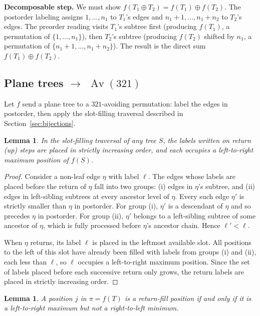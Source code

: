 \documentclass[a4paper,11pt]{article}
\newtheorem{lemma}[theorem]{Lemma}
\theoremstyle{definition}
\DeclareMathOperator{\Av}{Av}
\begin{document}
\textbf{Decomposable step.}
We must show
$f(T_1 \oplus T_2) = f(T_1) \oplus f(T_2)$.
The postorder labeling assigns $1, \ldots, n_1$ to
$T_1$'s edges and $n_1{+}1, \ldots, n_1{+}n_2$ to
$T_2$'s edges. The preorder reading visits $T_1$'s
subtree first (producing $f(T_1)$, a permutation of
$\{1, \ldots, n_1\}$), then $T_2$'s subtree (producing
$f(T_2)$ shifted by $n_1$, a permutation of
$\{n_1{+}1, \ldots, n_1{+}n_2\}$). The result is the
direct sum $f(T_1) \oplus f(T_2)$.

\subsection{Plane trees $\to$ $\Av(321)$}\label{sec:bij-trees-321}

Let $f$ send a plane tree to a $321$-avoiding
permutation: label the edges in postorder, then apply
the slot-filling traversal described in
Section~\ref{sec:bijections}.

\begin{lemma}\label{lem:retlmax}
In the slot-filling traversal of any tree $S$, the
labels written on return (up) steps are placed in
strictly increasing order, and each occupies a
left-to-right maximum position of $f(S)$.
\end{lemma}

\begin{proof}
Consider a non-leaf edge $\eta$ with label $\ell$. The
edges whose labels are placed before the return of
$\eta$ fall into two groups: (i) edges in $\eta$'s
subtree, and (ii) edges in left-sibling subtrees at
every ancestor level of $\eta$. Every such edge $\eta'$
is strictly smaller than $\eta$ in postorder. For
group (i), $\eta'$ is a descendant of $\eta$ and so
precedes $\eta$ in postorder. For group (ii), $\eta'$
belongs to a left-sibling subtree of some ancestor of
$\eta$, which is fully processed before $\eta$'s
ancestor chain. Hence $\ell' < \ell$.

When $\eta$ returns, its label $\ell$ is placed in the
leftmost available slot. All positions to the left of
this slot have already been filled with labels from
groups (i) and (ii), each less than $\ell$, so $\ell$
occupies a left-to-right maximum position. Since the set
of labels placed before each successive return only
grows, the return labels are placed in strictly
increasing order.
\end{proof}

\begin{lemma}\label{lem:retfill}
A position $j$ in $\pi = f(T)$ is a return-fill position
if and only if it is a left-to-right maximum but not a
right-to-left minimum.
\end{lemma}
\end{document}
